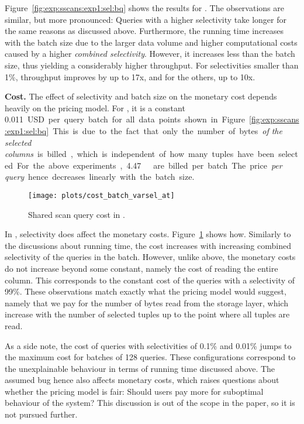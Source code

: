 Figure~\ref{fig:exp:sscans:exp1:sel:bq} shows the results
for \bigquery.
The observations are similar, but more pronounced:
Queries with a higher selectivity take longer
for the same reasons as discussed above.
Furthermore, the running time increases with the batch size
due to the larger data volume and higher computational costs
caused by a higher \emph{combined selectivity}.
However, it increases less than the batch size,
thus yielding a considerably higher throughput.
For selectivities smaller than 1\%,
throughput improves by up to 17x,
and for the others, up to 10x.


\textbf{Cost.} The effect of selectivity and batch size on the monetary cost
depends heavily on the pricing model.
For \bigquery, it is a constant \SI{0.011}USD per query batch
for all data points shown in Figure~\ref{fig:exp:sscans:exp1:sel:bq}.
This is due to the fact that
only the number of bytes \emph{of the selected columns} is billed,
which is independent of how many tuples have been selected.
For the above experiments, \SI{4.47}{\gibi\byte} are billed per batch.
The price \emph{per query} hence decreases linearly with the batch size.

\begin{figure}[!h]
    \centering
    \texttt{[image: plots/cost\_batch\_varsel\_at]}
    \caption{Shared scan query cost in \athena.}
    \label{fig:exp:sscans:exp1:cost:at}
\end{figure}

In \athena, selectivity does affect the monetary costs.
Figure~\ref{fig:exp:sscans:exp1:cost:at} shows how.
Similarly to the discussions about running time,
the cost increases with increasing combined selectivity
of the queries in the batch.
However, unlike above,
the monetary costs do not increase beyond some constant,
namely the cost of reading the entire column.
This corresponds to the constant cost
of the queries with a selectivity of 99\%.
These observations match exactly what the pricing model would suggest,
namely that we pay for the number of bytes read from the storage layer,
which increase with the number of selected tuples
up to the point where all tuples are read.

As a side note, the cost of queries with selectivities of 0.1\% and 0.01\%
jumps to the maximum cost for batches of 128 queries.
These configurations correspond to the unexplainable behaviour
in terms of running time discussed above.
The assumed bug hence also affects monetary costs,
which raises questions about whether the pricing model is fair:
Should users pay more for suboptimal behaviour of the \qaasl system?
This discussion is out of the scope in the paper,
so it is not pursued further.

